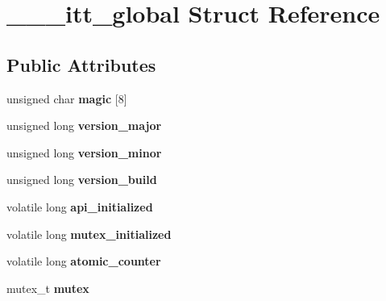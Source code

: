\hypertarget{struct______itt__global}{}\section{\+\_\+\+\_\+\+\_\+itt\+\_\+global Struct Reference}
\label{struct______itt__global}
\subsection*{Public Attributes}
\begin{DoxyCompactItemize}
\item 
unsigned char {\bfseries magic} \mbox{[}8\mbox{]}\hypertarget{struct______itt__global_ab0e52e46d4af19f31c990bedcd6948df}{}\label{struct______itt__global_ab0e52e46d4af19f31c990bedcd6948df}

\item 
unsigned long {\bfseries version\+\_\+major}\hypertarget{struct______itt__global_aaad26e96e84268d03a08cb840a2113c3}{}\label{struct______itt__global_aaad26e96e84268d03a08cb840a2113c3}

\item 
unsigned long {\bfseries version\+\_\+minor}\hypertarget{struct______itt__global_a4487d06049ec27f22ad144eb2f57e0b5}{}\label{struct______itt__global_a4487d06049ec27f22ad144eb2f57e0b5}

\item 
unsigned long {\bfseries version\+\_\+build}\hypertarget{struct______itt__global_a4ad1debe7bab64e55300de356e7f73a9}{}\label{struct______itt__global_a4ad1debe7bab64e55300de356e7f73a9}

\item 
volatile long {\bfseries api\+\_\+initialized}\hypertarget{struct______itt__global_adb68468b1a0fa798009ea4e128ae98f0}{}\label{struct______itt__global_adb68468b1a0fa798009ea4e128ae98f0}

\item 
volatile long {\bfseries mutex\+\_\+initialized}\hypertarget{struct______itt__global_a6c90634b5939d5718f63161edf0ee002}{}\label{struct______itt__global_a6c90634b5939d5718f63161edf0ee002}

\item 
volatile long {\bfseries atomic\+\_\+counter}\hypertarget{struct______itt__global_a43a21d694a84edc516d1d4cc07d65313}{}\label{struct______itt__global_a43a21d694a84edc516d1d4cc07d65313}

\item 
mutex\+\_\+t {\bfseries mutex}\hypertarget{struct______itt__global_ad09e87e07b15a780422e4ae565e06c5e}{}\label{struct______itt__global_ad09e87e07b15a780422e4ae565e06c5e}


\end{DoxyCompactItemize}
